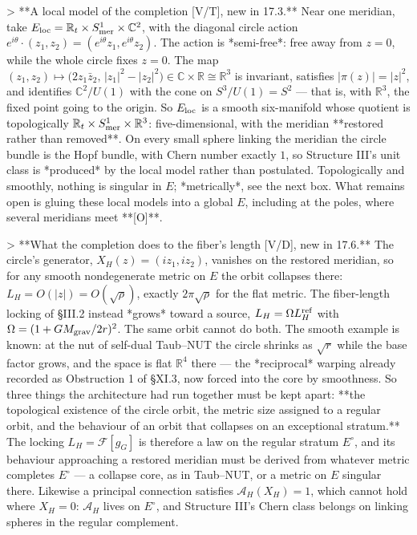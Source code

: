 > **A local model of the completion [V/T], new in 17.3.** Near one meridian, take $E_{\rm loc} = \mathbb R_t\times S^1_{\rm mer}\times\mathbb C^2$, with the diagonal circle action $e^{i\theta}\cdot(z_1,z_2) = (e^{i\theta}z_1,e^{i\theta}z_2)$. The action is *semi-free*: free away from $z = 0$, while the whole circle fixes $z = 0$. The map $(z_1,z_2)\mapsto\big(2z_1\bar z_2,\,|z_1|^2-|z_2|^2\big)\in\mathbb C\times\mathbb R\cong\mathbb R^3$ is invariant, satisfies $|\pi(z)| = |z|^2$, and identifies $\mathbb C^2/U(1)$ with the cone on $S^3/U(1) = S^2$ — that is, with $\mathbb R^3$, the fixed point going to the origin. So $E_{\rm loc}$ is a smooth six-manifold whose quotient is topologically $\mathbb R_t\times S^1_{\rm mer}\times\mathbb R^3$: five-dimensional, with the meridian **restored rather than removed**. On every small sphere linking the meridian the circle bundle is the Hopf bundle, with Chern number exactly $1$, so Structure III's unit class is *produced* by the local model rather than postulated. Topologically and smoothly, nothing is singular in $E$; *metrically*, see the next box. What remains open is gluing these local models into a global $E$, including at the poles, where several meridians meet **[O]**.

> **What the completion does to the fiber's length [V/D], new in 17.6.** The circle's generator, $X_H(z) = (iz_1,iz_2)$, vanishes on the restored meridian, so for any smooth nondegenerate metric on $E$ the orbit collapses there: $L_H = O(|z|) = O(\sqrt\rho)$, exactly $2\pi\sqrt\rho$ for the flat metric. The fiber-length locking of §III.2 instead *grows* toward a source, $L_H = \Omega L_H^{\rm ref}$ with $\Omega = (1+GM_{\rm grav}/2r)^2$. The same orbit cannot do both. The smooth example is known: at the nut of self-dual Taub–NUT the circle shrinks as $\sqrt r$ while the base factor grows, and the space is flat $\mathbb R^4$ there — the *reciprocal* warping already recorded as Obstruction 1 of §XI.3, now forced into the core by smoothness. So three things the architecture had run together must be kept apart: **the topological existence of the circle orbit, the metric size assigned to a regular orbit, and the behaviour of an orbit that collapses on an exceptional stratum.** The locking $L_H = \mathcal F[g_G]$ is therefore a law on the regular stratum $E^\circ$, and its behaviour approaching a restored meridian must be derived from whatever metric completes $E^\circ$ — a collapse core, as in Taub–NUT, or a metric on $E$ singular there. Likewise a principal connection satisfies $\mathcal A_H(X_H) = 1$, which cannot hold where $X_H = 0$: $\mathcal A_H$ lives on $E^\circ$, and Structure III's Chern class belongs on linking spheres in the regular complement.


